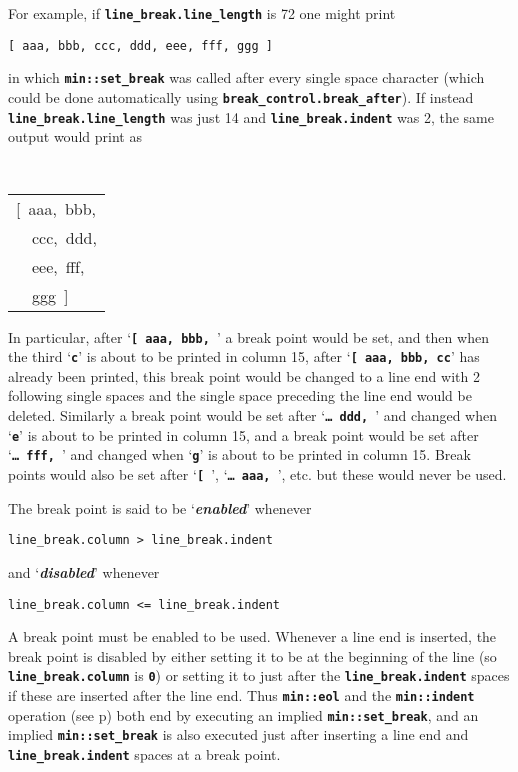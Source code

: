 \documentclass[12pt]{article}
\newcommand{\TT}[1]{{\tt \bfseries #1}}
\newcommand{\mkey}[2]{{\bf \em #1}\index{#1!#2}}
\newcommand{\pagref}[1]{p\pageref{#1}}
\newcommand{\EOL}{\penalty \exhyphenpenalty}
\begin{document}
For example, if \TT{line\_\EOL break.line\_\EOL length} is 72 one might
print
\begin{center}
\tt [ aaa, bbb, ccc, ddd, eee, fff, ggg ]
\end{center}
in which \TT{min::\EOL set\_\EOL break} was called after every single space
character (which could be done automatically using
\TT{break\_\EOL control.break\_\EOL after}).
If instead \TT{line\_\EOL break.line\_\EOL length}
was just 14 and \TT{line\_\EOL break.indent} was 2,
the same output would
print as
\begin{center}
\tt
\begin{tabular}{l}
[~aaa,~bbb, \\
~~ccc,~ddd, \\
~~eee,~fff, \\
~~ggg~] \\
\end{tabular}
\end{center}

In particular, after `\TT{[~aaa,~bbb,~}' a break point would be set,
and then when the third `\TT{c}' is about to be printed in column 15,
after `\TT{[~aaa,~bbb,~cc}' has already been printed, this
break point would be changed to a line end with 2 following single
spaces and the single space preceding the line end would be deleted.  Similarly
a break point would be set after `\TT{\ldots~ddd,~}' and changed
when `\TT{e}' is about to be printed in column 15, and a break
point would be set after `\TT{\ldots~fff,~}' and changed
when `\TT{g}' is about to be printed in column 15.  Break points
would also be set after `\TT{[~}', `\TT{\ldots~aaa,~}', etc. but
these would never be used.

The break point is said to be `\mkey{enabled}{break point}' whenever
\begin{center}
\tt line\_break.column > line\_break.indent
\end{center}
and `\mkey{disabled}{break point}' whenever
\begin{center}
\tt line\_break.column <= line\_break.indent
\end{center}
A break point must be enabled to be used.
Whenever a line end is inserted, the break point is
disabled by either setting it to be at the beginning of the line
(so \TT{line\_\EOL break.column} is \TT{0}) or setting it to
just after the \TT{line\_\EOL break.indent} spaces
if these are inserted after the line end.
Thus \TT{min::\EOL eol} and the \TT{min::\EOL indent} operation
(see \pagref{MIN::INDENT}) both end by executing
an implied \TT{min::\EOL set\_\EOL break},
and an implied \TT{min::\EOL set\_\EOL break}
is also executed just after inserting a line end
and \TT{line\_\EOL break.indent} spaces at a break point.
\end{document}
